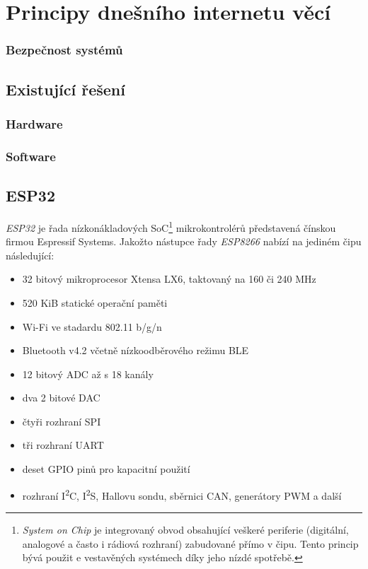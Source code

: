\chapter{Principy dnešního internetu věcí}
\label{ch:principy-iot}




\subsection{Bezpečnost systémů}


\section{Existující řešení}
\subsection{Hardware}

\subsection{Software}

\section{ESP32}
\textit{ESP32} je řada nízkonákladových SoC\footnote{\textit{System on Chip} je integrovaný obvod obsahující veškeré periferie (digitální, analogové a často i rádiová rozhraní) zabudované přímo v čipu. Tento princip bývá použit e vestavěných systémech díky jeho nízdé spotřebě.} mikrokontrolérů představená čínskou firmou Espressif Systems. Jakožto nástupce řady \textit{ESP8266} nabízí na jediném čipu následující:

\begin{itemize}
    \item 32 bitový mikroprocesor Xtensa LX6, taktovaný na 160 či 240 MHz
    \item 520 KiB statické operační paměti
    \item Wi-Fi ve stadardu 802.11 b/g/n
    \item Bluetooth v4.2 včetně nízkoodběrového režimu BLE
    \item 12 bitový ADC až s 18 kanály
    \item dva 2 bitové DAC
    \item čtyři rozhraní SPI
    \item tři rozhraní UART
    \item deset GPIO pinů pro kapacitní použití
    \item rozhraní I\textsuperscript{2}C, I\textsuperscript{2}S, Hallovu sondu, sběrnici CAN, generátory PWM a další
\end{itemize}

